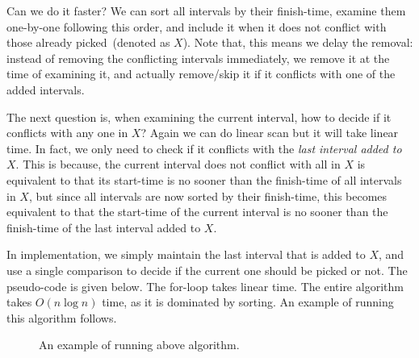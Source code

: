 Can we do it faster?
We can sort all intervals by their finish-time, examine them one-by-one following this order, and include it when it does not
conflict with those already picked~(denoted as $X$). %
Note that, this means we delay the removal: instead of removing the conflicting intervals immediately, we remove
it at the time of examining it, and actually remove/skip it if it conflicts with one of the added intervals.

The next question is, when examining the current interval, 
how to decide if it conflicts with any one in $X$?
Again we can do linear scan but it will take linear time.
In fact, we only need to check if it conflicts with the \emph{last interval added to $X$}.
This is because, the current interval does not conflict with all in $X$ 
is equivalent to that its start-time is no sooner than the finish-time of all intervals in $X$,
but since all intervals are now sorted by their finish-time,
this becomes equivalent to that the start-time of the current interval is no sooner than the 
finish-time of the last interval added to $X$.

In implementation, we simply maintain the last interval that is added to $X$,
and use a single comparison to decide if the current one should be picked or not.
The pseudo-code is given below.
The for-loop takes linear time. The entire algorithm takes $O(n\log n)$ time, as it is dominated by sorting.
An example of running this algorithm follows.

\begin{algorithmblock}[0.8\textwidth]
	\xxx
	\xxx
	\xxx
	\xxx
	\xxx
	\xxx
	\xxx
	\xxx
	\xxx
\end{algorithmblock}

\vspace*{-0.8cm}

\begin{figure}[h]
\centering{}
\caption{An example of running above algorithm.}
\label{fig:jump}
\end{figure}



